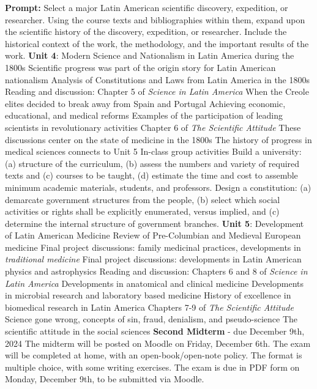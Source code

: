 \documentclass[10pt]{article}
\begin{document}
\begin{outline}[enumerate]
\2 \textbf{Prompt:} Select a major Latin American scientific discovery, expedition, or researcher.  Using the course texts and bibliographies within them, expand upon the scientific history of the discovery, expedition, or researcher.  Include the historical context of the work, the methodology, and the important results of the work.
\1 \textbf{Unit 4}: Modern Science and Nationalism in Latin America during the 1800s
\2 Scientific progress was part of the origin story for Latin American nationalism
\2 Analysis of Constitutions and Laws from Latin America in the 1800s
\2 Reading and discussion:
\3 Chapter 5 of \textit{Science in Latin America}
\4 When the Creole elites decided to break away from Spain and Portugal
\4 Achieving economic, educational, and medical reforms
\4 Examples of the participation of leading scientists in revolutionary activities
\3 Chapter 6 of \textit{The Scientific Attitude}
\4 These discussions center on the state of medicine in the 1800s
\4 The history of progress in medical sciences connects to Unit 5
\2 In-class group activities
\3 Build a university: (a) structure of the curriculum, (b) assess the numbers and variety of required texts and (c) courses to be taught, (d) estimate the time and cost to assemble minimum academic materials, students, and professors.
\3 Design a constitution: (a) demarcate government structures from the people, (b) select which social activities or rights shall be explicitly enumerated, versus implied, and (c) determine the internal structure of government branches.
\1 \textbf{Unit 5}: Development of Latin American Medicine
\2 Review of Pre-Columbian and Medieval European medicine
\2 Final project discussions: family medicinal practices, developments in \textit{traditional medicine}
\2 Final project discussions: developments in Latin American physics and astrophysics
\2 Reading and discussion:
\3 Chapters 6 and 8 of \textit{Science in Latin America}
\4 Developments in anatomical and clinical medicine
\4 Developments in microbial research and laboratory based medicine
\4 History of excellence in biomedical research in Latin America
\3 Chapters 7-9 of \textit{The Scientific Attitude}
\4 Science gone wrong, concepts of sin, fraud, denialism, and pseudo-science
\4 The scientific attitude in the social sciences
\1 \textbf{Second Midterm} - due December 9th, 2024
\2 The midterm will be posted on Moodle on Friday, December 6th.
\2 The exam will be completed at home, with an open-book/open-note policy.  The format is multiple choice, with some writing exercises.
\2 The exam is due in PDF form on Monday, December 9th, to be submitted via Moodle.

\end{outline}
\end{document}
